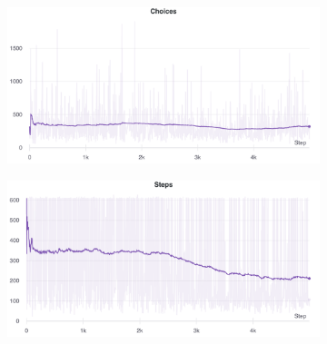 \documentclass[a4paper,10pt]{report}
\begin{document}
\begin{figure}[h]
	\medskip
	\begin{subfigure}{0.48\textwidth}
	\includegraphics[width=\linewidth]{bt-medium-choices.png}
	\end{subfigure}\hspace*{\fill}
	\begin{subfigure}{0.48\textwidth}
	\includegraphics[width=\linewidth]{bt-medium-steps.png}
	\end{subfigure}
	

\end{figure}
\end{document}
